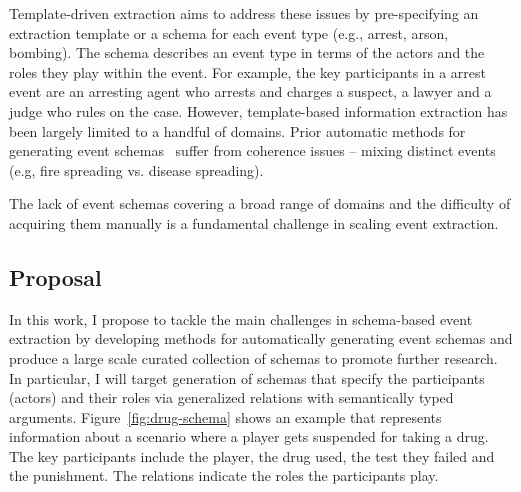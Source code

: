 Template-driven extraction aims to address these issues by pre-specifying an extraction template or a schema for each event type (e.g., arrest, arson, bombing). 
The schema describes an event type in terms of the actors and the roles they play within the event. %
For example, the key participants in a arrest event are an arresting agent who arrests and charges a suspect, a lawyer and a judge who rules on the case. However, template-based information extraction has been largely limited to a handful of domains. Prior automatic methods for generating event schemas~\cite{chambers-acl09} suffer from coherence issues -- mixing distinct events (e.g, fire spreading vs. disease spreading). 

The lack of event schemas covering a broad range of domains and the difficulty of acquiring them manually is a fundamental challenge in scaling event extraction. 


\subsection{Proposal}
In this work, I propose to tackle the main challenges in schema-based event extraction by developing methods for automatically generating event schemas and produce a large scale curated collection of schemas to promote further research. In particular, I will target generation of schemas that specify the participants (actors) and their roles via generalized relations with semantically typed arguments. Figure~\ref{fig:drug-schema} shows an example that represents information about a scenario where a player gets suspended for taking a drug. The key participants include the player, the drug used, the test they failed and the punishment. The relations indicate the roles the participants play.  

